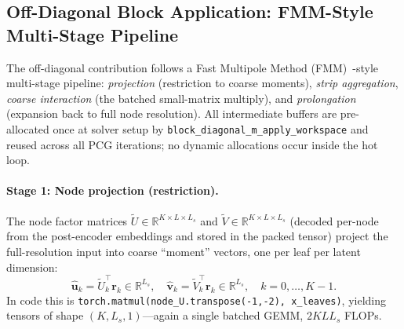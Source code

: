 \documentclass[acmtog,anonymous,review]{acmart}
\begin{document}
\subsection{Off-Diagonal Block Application: FMM-Style Multi-Stage Pipeline}
\label{sec:application:offdiag}

The off-diagonal contribution follows a Fast Multipole Method
(FMM)~\cite{greengard1987fast}-style multi-stage pipeline: \emph{projection} (restriction to
coarse moments), \emph{strip aggregation}, \emph{coarse interaction} (the batched small-matrix multiply), and
\emph{prolongation} (expansion back to full node resolution).  All intermediate buffers are
pre-allocated once at solver setup by \texttt{block\_diagonal\_m\_apply\_workspace} and reused
across all PCG iterations; no dynamic allocations occur inside the hot loop.

\paragraph{Stage 1: Node projection (restriction).}
The node factor matrices $\tilde{U} \in \mathbb{R}^{K \times L \times L_s}$ and
$\tilde{V} \in \mathbb{R}^{K \times L \times L_s}$ (decoded per-node from the post-encoder
embeddings and stored in the packed tensor) project the full-resolution input into coarse
``moment'' vectors, one per leaf per latent dimension:
\begin{equation}
  \hat{\mathbf{u}}_k = \tilde{U}_k^\top \mathbf{r}_k \in \mathbb{R}^{L_s}, \quad
  \hat{\mathbf{v}}_k = \tilde{V}_k^\top \mathbf{r}_k \in \mathbb{R}^{L_s}, \quad
  k = 0, \ldots, K-1.
  \label{eq:proj}
\end{equation}
In code this is \texttt{torch.matmul(node\_U.transpose(-1,-2), x\_leaves)}, yielding tensors of
shape $(K, L_s, 1)$---again a single batched GEMM, $2 K L L_s$ FLOPs.
\end{document}
